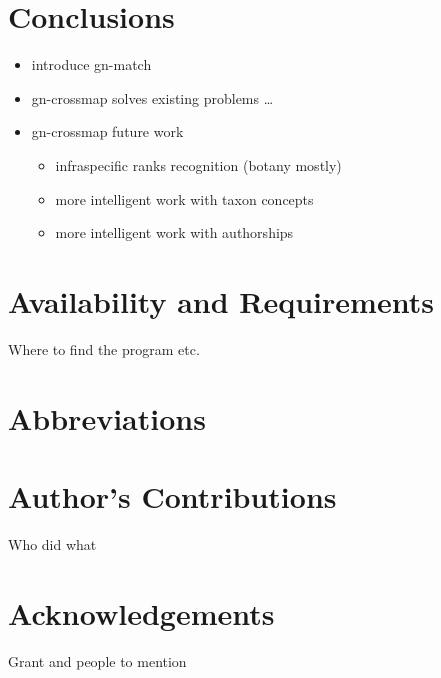 \documentclass{bmcart}
\begin{document}
\section*{Conclusions}
\begin{itemize}
  \item introduce gn-match
  \item gn-crossmap solves existing problems \ldots
  \item gn-crossmap future work
    \begin{itemize}
      \item infraspecific ranks recognition (botany mostly)
      \item more intelligent work with taxon concepts
      \item more intelligent work with authorships
    \end{itemize}
\end{itemize}

\section*{Availability and Requirements}

Where to find the program etc.

\section*{Abbreviations}


\section*{Author's Contributions}

Who did what

\section*{Acknowledgements}

Grant and people to mention



\end{document}
